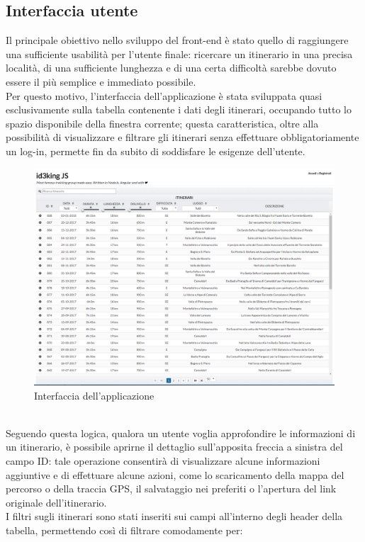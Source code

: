\documentclass[11pt]{report}
\begin{document}
\subsection{Interfaccia utente}
Il principale obiettivo nello sviluppo del front-end è stato quello di raggiungere una sufficiente usabilità per l'utente finale: ricercare un itinerario in una precisa località, di una sufficiente lunghezza e di una certa difficoltà sarebbe dovuto essere il più semplice e immediato possibile.
\\Per questo motivo, l'interfaccia dell'applicazione è stata sviluppata quasi esclusivamente sulla tabella contenente i dati degli itinerari, occupando tutto lo spazio disponibile della finestra corrente; questa caratteristica, oltre alla possibilità di visualizzare e filtrare gli itinerari senza effettuare obbligatoriamente un log-in, permette fin da subito di soddisfare le esigenze dell'utente.
\begin{figure}[h]
	\centering
	\includegraphics[scale=0.35]{ui_1.png}
	\caption{Interfaccia dell'applicazione \label{ui_1}}
\end{figure}
\\Seguendo questa logica, qualora un utente voglia approfondire le informazioni di un itinerario, è possibile aprirne il dettaglio sull'apposita freccia a sinistra del campo ID: tale operazione consentirà di visualizzare alcune informazioni aggiuntive e di effettuare alcune azioni, come lo scaricamento della mappa del percorso o della traccia GPS, il salvataggio nei preferiti o l'apertura del link originale dell'itinerario.
\\I filtri sugli itinerari sono stati inseriti sui campi all'interno degli header della tabella, permettendo così di filtrare comodamente per:
\end{document}
